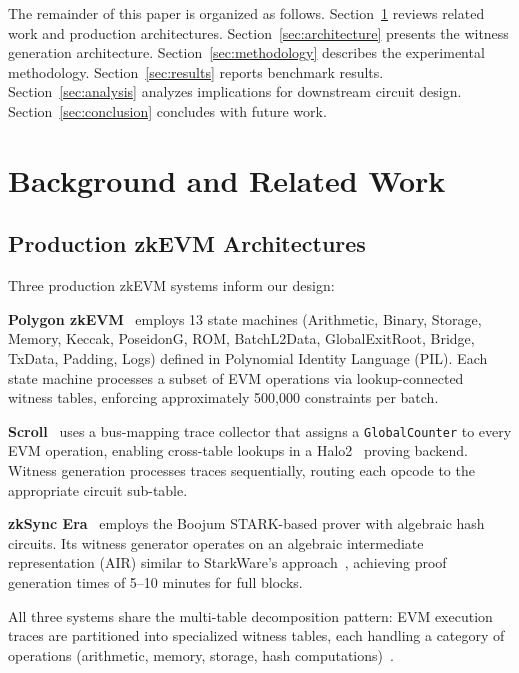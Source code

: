\documentclass[conference]{IEEEtran}
\begin{document}
The remainder of this paper is organized as follows.
Section~\ref{sec:background} reviews related work and production
architectures. Section~\ref{sec:architecture} presents the witness
generation architecture. Section~\ref{sec:methodology} describes the
experimental methodology. Section~\ref{sec:results} reports benchmark
results. Section~\ref{sec:analysis} analyzes implications for
downstream circuit design. Section~\ref{sec:conclusion} concludes with
future work.

\section{Background and Related Work}
\label{sec:background}

\subsection{Production zkEVM Architectures}

Three production zkEVM systems inform our design:

\textbf{Polygon zkEVM}~\cite{polygon-zkEVM-2023} employs 13 state
machines (Arithmetic, Binary, Storage, Memory, Keccak, PoseidonG, ROM,
BatchL2Data, GlobalExitRoot, Bridge, TxData, Padding, Logs) defined in
Polynomial Identity Language (PIL). Each state machine processes a
subset of EVM operations via lookup-connected witness tables, enforcing
approximately 500{,}000 constraints per batch.

\textbf{Scroll}~\cite{scroll-2024} uses a bus-mapping trace collector
that assigns a \texttt{GlobalCounter} to every EVM operation, enabling
cross-table lookups in a Halo2~\cite{halo2-2020} proving backend.
Witness generation processes traces sequentially, routing each opcode
to the appropriate circuit sub-table.

\textbf{zkSync Era}~\cite{zksync-era-2024} employs the Boojum
STARK-based prover with algebraic hash circuits. Its witness generator
operates on an algebraic intermediate representation (AIR) similar to
StarkWare's approach~\cite{starkware-2024}, achieving proof generation
times of 5--10 minutes for full blocks.

All three systems share the multi-table decomposition pattern: EVM
execution traces are partitioned into specialized witness tables, each
handling a category of operations (arithmetic, memory, storage, hash
computations)~\cite{tairi-2024}.
\end{document}
